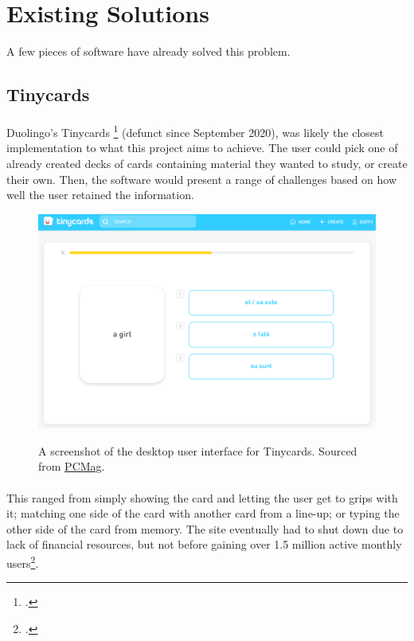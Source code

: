 \documentclass{report}
\begin{document}
\section{Existing Solutions}
A few pieces of software have already solved this problem. 

\subsection{Tinycards}
\paragraph{}
Duolingo's Tinycards \footcite{Tinycards} (defunct since September 2020), was likely the closest implementation to what this project aims to achieve. The user could pick one of already created decks of cards containing material they wanted to study, or create their own. Then, the software would present a range of challenges based on how well the user retained the information. 

\begin{figure}[h!]
  \includegraphics[width=\linewidth]{media/tinycards.png}
  \label{fig:tinycards1}
  \caption{A screenshot of the desktop user interface for Tinycards. Sourced from \href{https://web.archive.org/web/20211005121604/https://www.pcmag.com/reviews/tinycards-by-duolingo}{PCMag}.}
\end{figure}

\paragraph{}
This ranged from simply showing the card and letting the user get to grips with it; matching one side of the card with another card from a line-up; or typing the other side of the card from memory. The site eventually had to shut down due to lack of financial resources, but not before gaining over 1.5 million active monthly users\footcite{TinycardsShutdown}.
\end{document}
